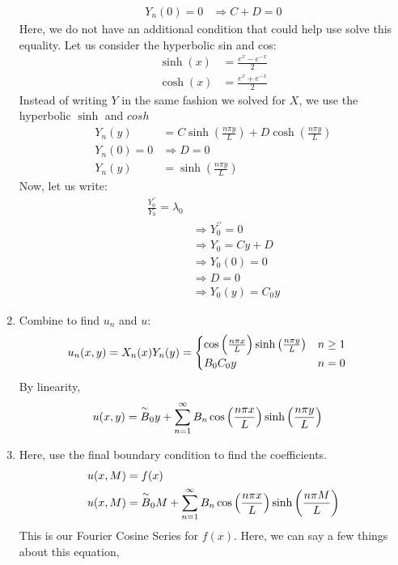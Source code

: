 \begin{enumerate}
\begin{align}
  Y_n(0) = 0 & \Rightarrow C + D = 0
\end{align}
Here, we do not have an additional condition that could help use solve this equality. Let us consider the hyperbolic sin and cos:
\begin{align}
  \sinh(x) & = \frac{e^x - e^{-x}}{2}\\
  \cosh(x) & = \frac{e^x + e^{-x}}{2}
\end{align}
Instead of writing $Y$ in the same fashion we solved for $X$, we use the hyperbolic $\sinh$ and $cosh$
\begin{align}
  Y_n(y) & = C \sinh \left(\frac{n \pi y}{L} \right) + D \cosh \left( \frac{n \pi y}{L} \right)\\
  Y_n(0) = 0 & \Rightarrow D = 0\\
  Y_n(y) & = \sinh \left( \frac{n \pi y}{L} \right)
\end{align}
Now, let us write:
\begin{align}
  \frac{Y^{\prime\prime}_0}{Y_0} = \lambda_0 &\\
  & \Rightarrow Y^{\prime\prime}_0 = 0\\
  & \Rightarrow Y_0 = Cy + D\\
  & \Rightarrow Y_0(0) = 0\\
  & \Rightarrow D = 0\\
  & \Rightarrow Y_0(y) = C_0 y
\end{align}
\item Combine to find $u_n$ and $u$:
\begin{align}
  u_n(x, y) = X_n(x)Y_n(y) & =
  \begin{cases}
    \cos \Big( \frac{n \pi x}{L} \Big) \sinh \left( \frac{n \pi y}{L} \right) & n \geq 1\\
    B_0C_0y & n = 0
  \end{cases}
\end{align}
By linearity,
\begin{align}
  u(x, y) & = \overset{\sim}{B}_0 y + \sum^\infty_{n = 1} B_n \cos \Big( \frac{n \pi x}{L} \Big) \sinh \left( \frac{n \pi y}{L} \right)
\end{align}
\item Here, use the final boundary condition to find the coefficients.
\begin{align}
  u(x, M) & = f(x)\\
  u(x, M) & = \overset{\sim}{B}_0 M + \sum^\infty_{n = 1} B_n \cos \Big( \frac{n \pi x}{L} \Big) \sinh\left( \frac{n \pi M}{L} \right)
\end{align}
This is our Fourier Cosine Series for $f(x)$. Here, we can say a few things about this equation,
\begin{itemize}

\end{itemize}
\end{enumerate}
